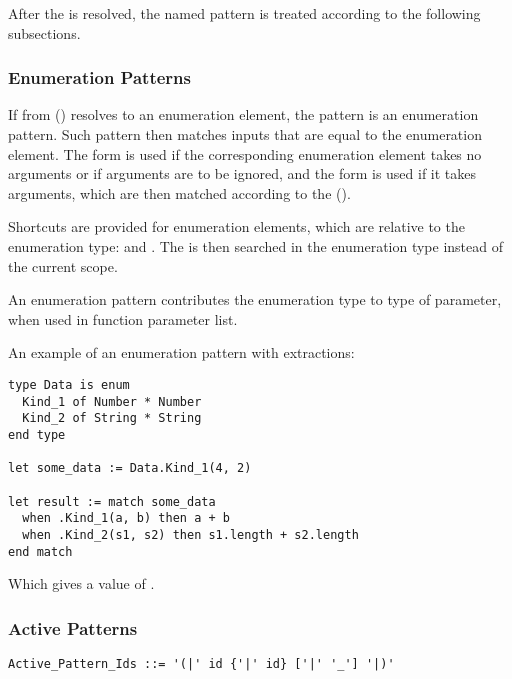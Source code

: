 After the  is resolved, the named pattern is treated according to the following subsections. 





\subsubsection{Enumeration Patterns}
\label{sec:enumeration-patterns}

If  from () resolves to an enumeration element, the pattern is an enumeration pattern. Such pattern then matches inputs that are equal to the enumeration element. The form  is used if the corresponding enumeration element takes no arguments or if arguments are to be ignored, and the form  is used if it takes arguments, which are then matched according to the  (). 

Shortcuts are provided for enumeration elements, which are relative to the enumeration type:  and . The  is then searched in the enumeration type instead of the current scope. 

An enumeration pattern contributes the enumeration type to type of parameter, when used in function parameter list. 

\example An example of an enumeration pattern with extractions:
\begin{lstlisting}
type Data is enum
  Kind_1 of Number * Number
  Kind_2 of String * String
end type

let some_data := Data.Kind_1(4, 2)

let result := match some_data
  when .Kind_1(a, b) then a + b
  when .Kind_2(s1, s2) then s1.length + s2.length
end match
\end{lstlisting}
Which gives  a value of . 





\subsubsection{Active Patterns}
\label{sec:active-patterns}

\syntax\begin{lstlisting}
Active_Pattern_Ids ::= '(|' id {'|' id} ['|' '_'] '|)'
\end{lstlisting}

